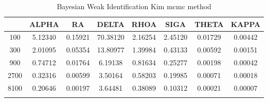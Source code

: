 \documentclass[a4paper,10pt]{article}
\begin{document}
\centering
\begin{longtable}{cccccccc}
\toprule
 & ALPHA & RA & DELTA & RHOA & SIGA & THETA & KAPPA \\
\midrule
100 & 5.12340 & 0.15921 & 70.38120 & 2.16254 & 2.45120 & 0.01729 & 0.00442 \\
300 & 2.01095 & 0.05354 & 13.80977 & 1.39984 & 0.43133 & 0.00592 & 0.00151 \\
900 & 0.74712 & 0.01764 & 6.19138 & 0.81634 & 0.25277 & 0.00198 & 0.00042 \\
2700 & 0.32316 & 0.00599 & 3.50164 & 0.58203 & 0.19985 & 0.00071 & 0.00018 \\
8100 & 0.20646 & 0.00197 & 3.64481 & 0.38089 & 0.10312 & 0.00021 & 0.00007 \\
\bottomrule
\caption{Bayesian Weak Identification Kim mcmc method}
\label{table:tbl:WeakKim_mcmc}
\end{longtable}
\end{document}
